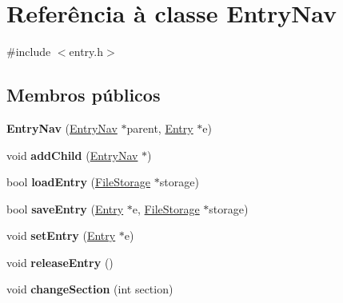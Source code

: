 \hypertarget{class_entry_nav}{\section{Referência à classe Entry\-Nav}
\label{class_entry_nav}
}


{\ttfamily \#include $<$entry.\-h$>$}

\subsection*{Membros públicos}
\begin{DoxyCompactItemize}
\item 
\hypertarget{class_entry_nav_a941a76ca9bbfb2be735c0758ed69600d}{{\bfseries Entry\-Nav} (\hyperlink{class_entry_nav}{Entry\-Nav} $\ast$parent, \hyperlink{class_entry}{Entry} $\ast$e)}\label{class_entry_nav_a941a76ca9bbfb2be735c0758ed69600d}

\item 
\hypertarget{class_entry_nav_a2f6cf657944d22216f8fb8ef156254c2}{void {\bfseries add\-Child} (\hyperlink{class_entry_nav}{Entry\-Nav} $\ast$)}\label{class_entry_nav_a2f6cf657944d22216f8fb8ef156254c2}

\item 
\hypertarget{class_entry_nav_a01f0f9155d1a602479a171be7e85f250}{bool {\bfseries load\-Entry} (\hyperlink{class_file_storage}{File\-Storage} $\ast$storage)}\label{class_entry_nav_a01f0f9155d1a602479a171be7e85f250}

\item 
\hypertarget{class_entry_nav_a80c62156ea1d2a0b7e81727002786f41}{bool {\bfseries save\-Entry} (\hyperlink{class_entry}{Entry} $\ast$e, \hyperlink{class_file_storage}{File\-Storage} $\ast$storage)}\label{class_entry_nav_a80c62156ea1d2a0b7e81727002786f41}

\item 
\hypertarget{class_entry_nav_ab3125be2faca69b4f73e67af9b4dbc98}{void {\bfseries set\-Entry} (\hyperlink{class_entry}{Entry} $\ast$e)}\label{class_entry_nav_ab3125be2faca69b4f73e67af9b4dbc98}

\item 
\hypertarget{class_entry_nav_ab80523e614455295217753c3869ac309}{void {\bfseries release\-Entry} ()}\label{class_entry_nav_ab80523e614455295217753c3869ac309}

\item 
\hypertarget{class_entry_nav_aff69524700397548f4b68cb18b7a8c98}{void {\bfseries change\-Section} (int section)}\label{class_entry_nav_aff69524700397548f4b68cb18b7a8c98}


\end{DoxyCompactItemize}

